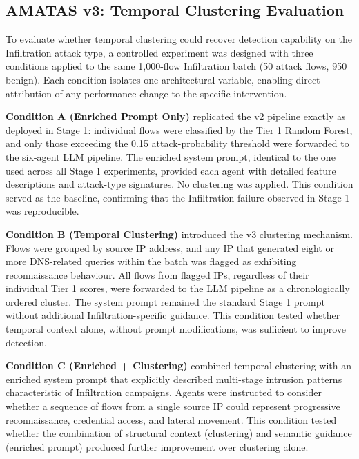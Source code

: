 \documentclass[../main.tex]{subfiles}
\begin{document}
\subsection{AMATAS v3: Temporal Clustering Evaluation}
\label{sec:v3-clustering}

To evaluate whether temporal clustering could recover detection capability on the Infiltration attack type, a controlled experiment was designed with three conditions applied to the same 1{,}000-flow Infiltration batch (50 attack flows, 950 benign). Each condition isolates one architectural variable, enabling direct attribution of any performance change to the specific intervention.

\textbf{Condition A (Enriched Prompt Only)} replicated the v2 pipeline exactly as deployed in Stage 1: individual flows were classified by the Tier 1 Random Forest, and only those exceeding the 0.15 attack-probability threshold were forwarded to the six-agent LLM pipeline. The enriched system prompt, identical to the one used across all Stage 1 experiments, provided each agent with detailed feature descriptions and attack-type signatures. No clustering was applied. This condition served as the baseline, confirming that the Infiltration failure observed in Stage 1 was reproducible.

\textbf{Condition B (Temporal Clustering)} introduced the v3 clustering mechanism. Flows were grouped by source IP address, and any IP that generated eight or more DNS-related queries within the batch was flagged as exhibiting reconnaissance behaviour. All flows from flagged IPs, regardless of their individual Tier 1 scores, were forwarded to the LLM pipeline as a chronologically ordered cluster. The system prompt remained the standard Stage 1 prompt without additional Infiltration-specific guidance. This condition tested whether temporal context alone, without prompt modifications, was sufficient to improve detection.

\textbf{Condition C (Enriched + Clustering)} combined temporal clustering with an enriched system prompt that explicitly described multi-stage intrusion patterns characteristic of Infiltration campaigns. Agents were instructed to consider whether a sequence of flows from a single source IP could represent progressive reconnaissance, credential access, and lateral movement. This condition tested whether the combination of structural context (clustering) and semantic guidance (enriched prompt) produced further improvement over clustering alone.
\end{document}
